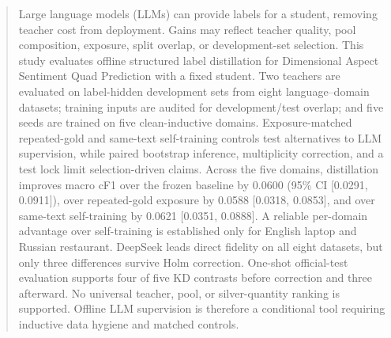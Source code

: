 \begin{abstract}
Large language models (LLMs) can provide labels for a student, removing teacher
cost from deployment. Gains may reflect teacher quality, pool composition,
exposure, split overlap, or development-set selection. This study evaluates
offline structured label distillation for Dimensional Aspect Sentiment Quad
Prediction with a fixed student. Two teachers are evaluated on label-hidden
development sets from eight language--domain datasets; training inputs are
audited for development/test overlap; and five seeds are trained on five
clean-inductive domains. Exposure-matched repeated-gold and same-text
self-training controls test alternatives to LLM supervision, while paired
bootstrap inference, multiplicity correction, and a test lock limit
selection-driven claims. Across the five domains, distillation improves macro
cF1 over the frozen baseline by 0.0600 (95\% CI [0.0291, 0.0911]), over
repeated-gold exposure by 0.0588 [0.0318, 0.0853], and over same-text
self-training by 0.0621 [0.0351, 0.0888]. A reliable per-domain advantage over
self-training is established only for English laptop and Russian restaurant.
DeepSeek leads direct fidelity on all eight datasets, but only three differences
survive Holm correction. One-shot official-test evaluation supports four of
five KD contrasts before correction and three afterward. No universal teacher,
pool, or silver-quantity ranking is supported. Offline LLM supervision is
therefore a conditional tool requiring inductive data hygiene and matched
controls.
\end{abstract}



\maketitle







